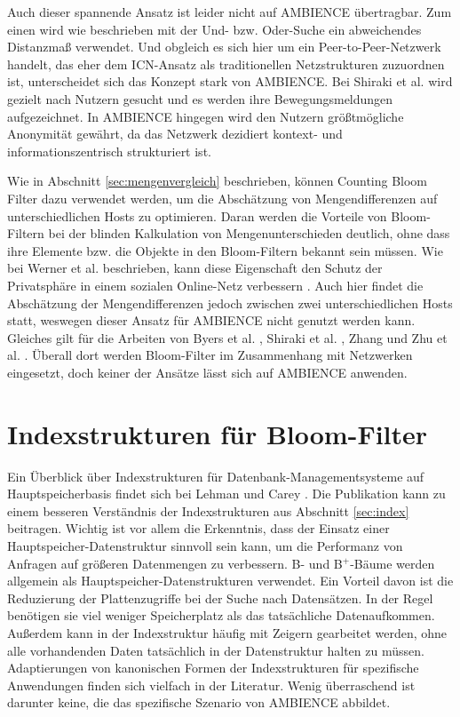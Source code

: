Auch dieser spannende Ansatz ist leider nicht auf AMBIENCE übertragbar. Zum einen wird wie beschrieben mit der Und- bzw. Oder-Suche ein abweichendes Distanzmaß verwendet. Und obgleich es sich hier um ein Peer-to-Peer-Netzwerk handelt, das eher dem ICN-Ansatz als traditionellen Netzstrukturen zuzuordnen ist, unterscheidet sich das Konzept stark von AMBIENCE. Bei Shiraki et al. wird gezielt nach Nutzern gesucht und es werden ihre Bewegungsmeldungen aufgezeichnet. In AMBIENCE hingegen wird den Nutzern größtmögliche Anonymität gewährt, da das Netzwerk dezidiert kontext- und informationszentrisch strukturiert ist. 

Wie in Abschnitt \ref{sec:mengenvergleich} beschrieben, können Counting Bloom Filter dazu verwendet werden, um die Abschätzung von Mengendifferenzen auf unterschiedlichen Hosts zu optimieren. Daran werden die Vorteile von Bloom-Filtern bei der blinden Kalkulation von Mengenunterschieden deutlich, ohne dass ihre Elemente bzw. die Objekte in den Bloom-Filtern bekannt sein müssen. Wie bei Werner et al. beschrieben, kann diese Eigenschaft den Schutz der Privatsphäre in einem sozialen Online-Netz verbessern \cite{Werner2015}. Auch hier findet die Abschätzung der Mengendifferenzen jedoch zwischen zwei unterschiedlichen Hosts statt, weswegen dieser Ansatz für AMBIENCE nicht genutzt werden kann. Gleiches gilt für die Arbeiten von Byers et al. \cite{Byers2002}, Shiraki et al. \cite{Shiraki2009}, Zhang \cite{Zhang2012} und Zhu et al. \cite{Zhu2004}. Überall dort werden Bloom-Filter im Zusammenhang mit Netzwerken eingesetzt, doch keiner der Ansätze lässt sich auf AMBIENCE anwenden. 
\section{Indexstrukturen für Bloom-Filter}\label{sec:bloom-index}
Ein Überblick über Indexstrukturen für Datenbank-Managementsysteme auf Hauptspei\-cher\-basis findet sich bei Lehman und Carey \cite{Lehman1986}. Die Publikation kann zu einem besseren Verständnis der Indexstrukturen aus Abschnitt \ref{sec:index} beitragen. Wichtig ist vor allem die Erkenntnis, dass der Einsatz einer Hauptspeicher-Datenstruktur sinnvoll sein kann, um die Performanz von Anfragen auf größeren Datenmengen zu verbessern. B- und B$^+$-Bäume werden allgemein als Hauptspeicher-Datenstruk\-turen verwendet. Ein Vorteil davon ist die Reduzierung der Plattenzugriffe bei der Suche nach Datensätzen. In der Regel benötigen sie viel weniger Speicherplatz als das tatsächliche Datenaufkommen. Außerdem kann in der Indexstruktur häufig mit Zeigern gearbeitet werden, ohne alle vorhandenden Daten tatsächlich in der Datenstruktur halten zu müssen. Adaptierungen von kanonischen Formen der Indexstrukturen für spezifische Anwendungen finden sich vielfach in der Literatur. Wenig überraschend ist darunter keine, die das spezifische Szenario von AMBIENCE abbildet.

